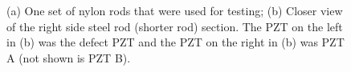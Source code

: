 \begin{figure}
\begin{subfigmatrix}{2}
\end{subfigmatrix}

  \caption[all]
  { \label{fig:nylonTR}
(a) One set of nylon rods that were used for testing;
(b) Closer view of the right side steel rod (shorter rod) section. The PZT on the left in (b) was the defect PZT and the PZT on the right in (b) was PZT A (not shown is PZT B).
}
\end{figure}

